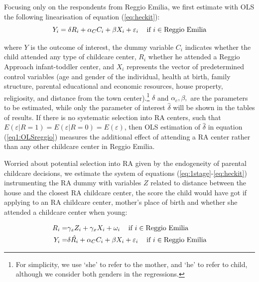 \documentclass[12pt]{article}
\begin{document}
Focusing only on the respondents from Reggio Emilia, we first estimate with OLS the following linearisation of equation (\ref{eq:heckit}):
\begin{equation}
Y_{i} = \delta R_{i} + \alpha_{C} C_{i} + \beta X_{i} + \varepsilon_{i}    \hspace{2ex} \text{ if } i \in \text{Reggio Emilia} \label{eq1:OLSreggio}
\end{equation}

where $Y$ is the outcome of interest, the dummy variable $C_{i}$ indicates whether the child attended any type of childcare center, $R_{i}$ whether he attended a Reggio Approach infant-toddler center, and $X_{i}$ represents the vector of predetermined control variables (age and gender of the individual, health at birth, family structure, parental educational and economic resources, house property, religiosity, and distance from the town center).\footnote{For simplicity, we use `she' to refer to the mother, and `he' to refer to child, although we consider both genders in the regressions.} $\delta$ and $\alpha_{c}, \beta,$ are the parameters to be estimated, while only the parameter of interest $\hat{\delta}$ will be shown in the tables of results. If there is no systematic selection into RA centers, such that $E(\varepsilon|R=1)=E(\varepsilon|R=0)=E(\varepsilon)$, then OLS estimation of $\hat{\delta}$ in equation (\ref{eq1:OLSreggio}) measures the additional effect of attending a RA center rather than any other childcare center in Reggio Emilia.

\medskip

Worried about potential selection into RA given by the endogeneity of parental childcare decisions, we estimate the system of equations (\ref{eq:1stage}-\ref{eq:heckit}) instrumenting the RA dummy with variables $Z$ related to distance between the house and the closest RA childcare center, the score the child would have got if applying to an RA childcare center, mother's place of birth and whether she attended a childcare center when young:

\begin{align}
R_{i} =& \gamma_{z} Z_{i} + \gamma_{x} X_{i} + \omega_{i} \hspace{2ex} \text{ if } i \in \text{Reggio Emilia} \label{eq:est1stage} \\

Y_{i} =& \delta \hat{R_{i}} + \alpha_{C} C_{i} + \beta X_{i} + \varepsilon_{i} \hspace{2ex} \text{ if } i \in \text{Reggio Emilia} \label{eq2:IVreggio}


\end{align}
\end{document}
